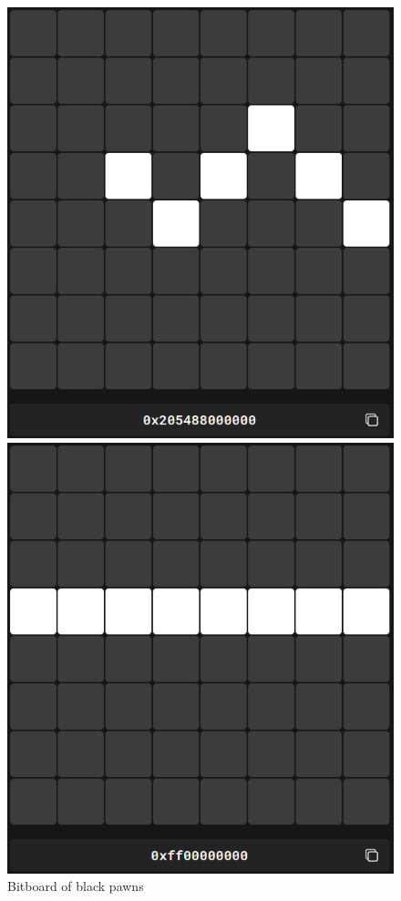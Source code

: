 \begin{figure}[H]
    \centering
    \begin{minipage}[c]{0.30\textwidth}
        \centering
        \includegraphics[width=\textwidth]{Imagenes/bitboard_black_pawns.png}
        \caption*{Bitboard of black pawns}
    \end{minipage}
    \hfill
    \begin{minipage}[c]{0.30\textwidth}
        \centering
        \includegraphics[width=\textwidth]{Imagenes/fifth_rank_mask.png}

\end{minipage}
\end{figure}
